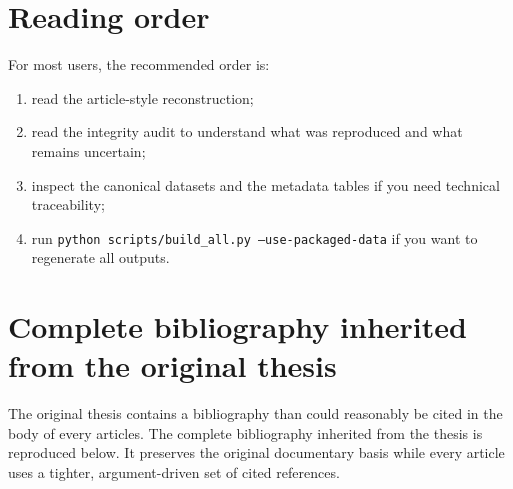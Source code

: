 \documentclass[11pt,a4paper]{article}
\begin{document}
\section{Reading order}
For most users, the recommended order is:
\begin{enumerate}[leftmargin=1.5em]
    \item read the article-style reconstruction;
    \item read the integrity audit to understand what was reproduced and what remains uncertain;
    \item inspect the canonical datasets and the metadata tables if you need technical traceability;
    \item run \texttt{python scripts/build\_all.py --use-packaged-data} if you want to regenerate all outputs.
\end{enumerate}

\section{Complete bibliography inherited from the original thesis}
The original thesis contains a bibliography than could reasonably be cited in the body of every articles. The complete bibliography inherited from the thesis is reproduced below. It preserves the original documentary basis while every article uses a tighter, argument-driven set of cited references.

\nocite{*}
\printbibliography
\end{document}
